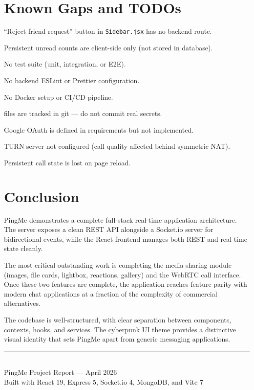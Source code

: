 \documentclass[12pt,a4paper]{article}
\newcommand{\pingme}{PingMe\xspace}
\newcommand{\code}[1]{\texttt{#1}}
\newcommand{\file}[1]{\texttt{\detokenize{#1}}}
\begin{document}
\section{Known Gaps and TODOs}
\label{sec:gaps}

\begin{compactitem}
    \item ``Reject friend request'' button in \code{Sidebar.jsx} has no backend route.
    \item Persistent unread counts are client-side only (not stored in database).
    \item No test suite (unit, integration, or E2E).
    \item No backend ESLint or Prettier configuration.
    \item No Docker setup or CI/CD pipeline.
    \item \file{.env} files are tracked in git --- do not commit real secrets.
    \item Google OAuth is defined in requirements but not implemented.
    \item TURN server not configured (call quality affected behind symmetric NAT).
    \item Persistent call state is lost on page reload.
\end{compactitem}

\section{Conclusion}
\label{sec:conclusion}

\pingme{} demonstrates a complete full-stack real-time application architecture.
The server exposes a clean REST API alongside a Socket.io server for bidirectional
events, while the React frontend manages both REST and real-time state cleanly.

The most critical outstanding work is completing the media sharing module
(images, file cards, lightbox, reactions, gallery) and the WebRTC call
interface. Once these two features are complete, the application reaches
feature parity with modern chat applications at a fraction of the complexity
of commercial alternatives.

The codebase is well-structured, with clear separation between components,
contexts, hooks, and services. The cyberpunk UI theme provides a distinctive
visual identity that sets \pingme{} apart from generic messaging applications.

\vfill
\begin{center}
    \rule{0.7\linewidth}{0.5pt} \\
    \small\color{muted}
    \pingme{} Project Report --- April 2026 \\
    Built with React 19, Express 5, Socket.io 4, MongoDB, and Vite 7
\end{center}
\end{document}
